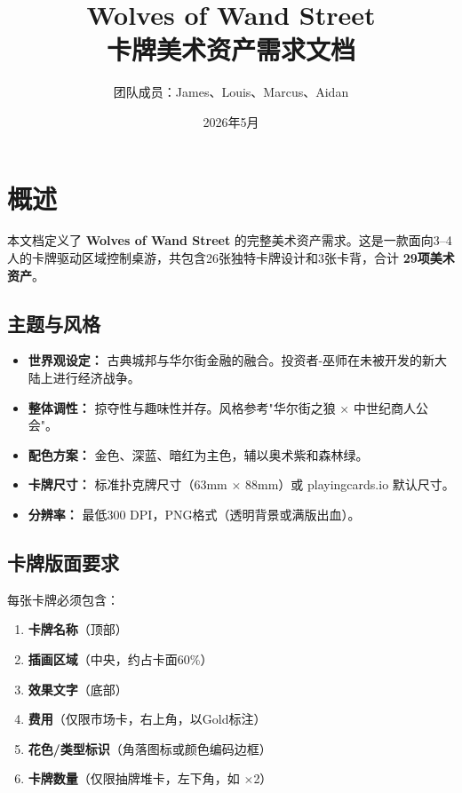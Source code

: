 \documentclass[a4paper,11pt]{article}
\title{\Huge\textbf{Wolves of Wand Street}\\[0.5em]\Large 卡牌美术资产需求文档}
\author{团队成员：James、Louis、Marcus、Aidan}
\date{2026年5月}
\begin{document}
\maketitle
\thispagestyle{fancy}

\section{概述}

本文档定义了 \textbf{Wolves of Wand Street} 的完整美术资产需求。这是一款面向3--4人的卡牌驱动区域控制桌游，共包含26张独特卡牌设计和3张卡背，合计 \textbf{29项美术资产}。

\subsection{主题与风格}

\begin{itemize}[leftmargin=*]
    \item \textbf{世界观设定：} 古典城邦与华尔街金融的融合。投资者-巫师在未被开发的新大陆上进行经济战争。
    \item \textbf{整体调性：} 掠夺性与趣味性并存。风格参考"华尔街之狼 × 中世纪商人公会"。
    \item \textbf{配色方案：} 金色、深蓝、暗红为主色，辅以奥术紫和森林绿。
    \item \textbf{卡牌尺寸：} 标准扑克牌尺寸（63mm $\times$ 88mm）或 playingcards.io 默认尺寸。
    \item \textbf{分辨率：} 最低300 DPI，PNG格式（透明背景或满版出血）。
\end{itemize}

\subsection{卡牌版面要求}

每张卡牌必须包含：
\begin{enumerate}[leftmargin=*]
    \item \textbf{卡牌名称}（顶部）
    \item \textbf{插画区域}（中央，约占卡面60\%）
    \item \textbf{效果文字}（底部）
    \item \textbf{费用}（仅限市场卡，右上角，以Gold标注）
    \item \textbf{花色/类型标识}（角落图标或颜色编码边框）
    \item \textbf{卡牌数量}（仅限抽牌堆卡，左下角，如 $\times$2）
\end{enumerate}
\end{document}
